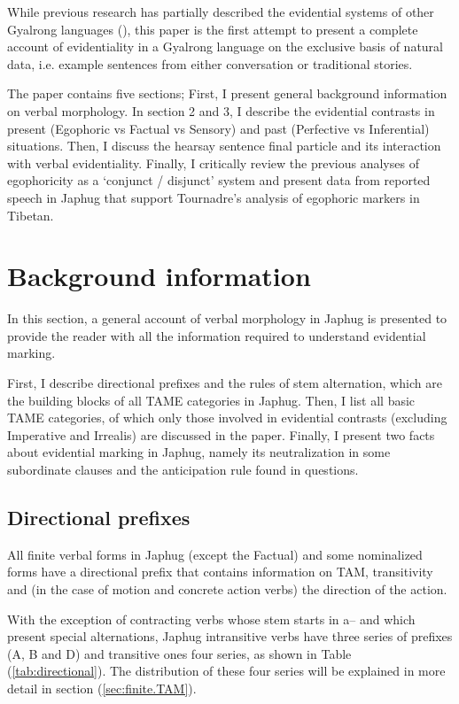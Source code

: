 \documentclass[oldfontcommands,oneside,a4paper,11pt]{article}
\newcommand{\ipa}[1]{{\phon \mbox{#1}}} %
\newcommand{\refb}[1]{(\ref{#1})}
\begin{document}
While previous research has partially described the evidential systems of other Gyalrong languages (\citealt{linyj03tense}), this paper is the first attempt to present a complete account of evidentiality in a Gyalrong language on the exclusive basis of natural data, i.e. example sentences from either conversation or traditional stories.

The paper contains five sections; First, I present general background information on verbal morphology. In section 2 and 3, I describe the evidential contrasts in present (Egophoric vs Factual vs Sensory) and past (Perfective vs Inferential) situations. Then, I discuss the hearsay sentence final particle and its interaction with verbal evidentiality. Finally, I critically review the previous analyses of egophoricity as a `conjunct / disjunct' system and present data from reported speech in Japhug that support Tournadre's \citeyearpar{tournadre08conjunct} analysis of egophoric markers in Tibetan.


\section{Background information}
In this section, a general account of verbal morphology in Japhug is presented to provide the reader with all the information required to understand evidential marking.

First, I describe directional prefixes and the rules of stem alternation, which are the building blocks of all TAME categories in Japhug. Then, I list all basic TAME categories, of which only those involved in evidential contrasts (excluding Imperative and Irrealis) are discussed in the paper. Finally, I present two facts about evidential marking in Japhug, namely its neutralization in some subordinate clauses and the anticipation rule found in questions.

\subsection{Directional prefixes} \label{sec:directional}
All finite verbal forms in Japhug (except the Factual) and some nominalized forms have a directional prefix that contains information on TAM, transitivity and  (in the case of motion and concrete action verbs) the direction of the action.

With the exception of contracting verbs whose stem starts in \ipa{a--} and which present special alternations, Japhug intransitive verbs have three series of prefixes (A, B and D) and transitive ones four series, as shown in Table \refb{tab:directional}. The distribution of these four series will be explained in more detail in section \refb{sec:finite.TAM}.
\end{document}
